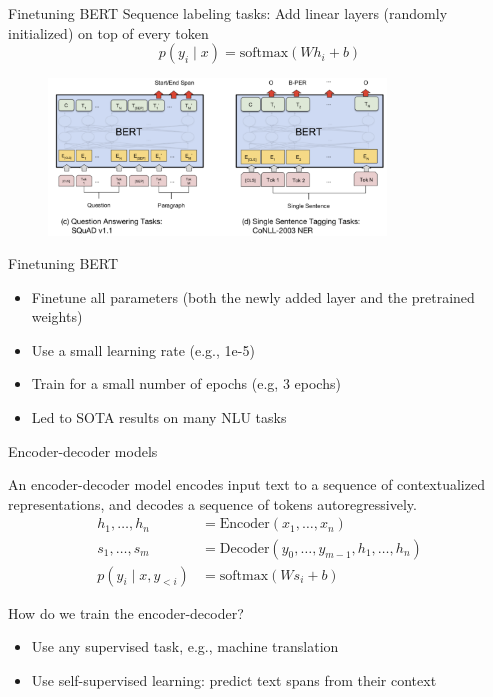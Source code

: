 \documentclass[usenames,dvipsnames,notes,11pt,aspectratio=169,hyperref={colorlinks=true, linkcolor=blue}]{beamer}
\begin{document}
\begin{frame}
    {Finetuning BERT}
        Sequence labeling tasks:
            Add linear layers (randomly initialized) on top of every token 
            $$
            p(y_i \mid x) = \mathrm{softmax}(Wh_{i}+b)
            $$
            \begin{figure}
                \includegraphics[width=0.8\textwidth]{figures/bert-seq-label}
            \end{figure}
\end{frame}

\begin{frame}
    {Finetuning BERT}

    \begin{itemize}
        \item Finetune all parameters (both the newly added layer and the pretrained weights)
        \item Use a small learning rate (e.g., 1e-5)
        \item Train for a small number of epochs (e.g, 3 epochs)
        \item Led to SOTA results on many NLU tasks
    \end{itemize}
\end{frame}

\begin{frame}
    {Encoder-decoder models}

    An encoder-decoder model encodes input text to a sequence of contextualized representations, and decodes a sequence of tokens autoregressively.
    \begin{align*}
        h_1,\ldots,h_n &= \mathrm{Encoder}(x_1,\ldots,x_n) \\
        s_1,\ldots,s_m &= \mathrm{Decoder}(y_0,\ldots,y_{m-1}, h_1,\ldots,h_n)\\
        p(y_i\mid x, y_{<i}) &= \mathrm{softmax}(Ws_i+b)
    \end{align*}

    \pause
    How do we train the encoder-decoder?
    \begin{itemize}
        \item Use any supervised task, e.g., machine translation 
        \item Use self-supervised learning: predict text spans from their context 
    \end{itemize}
\end{frame}
\end{document}

